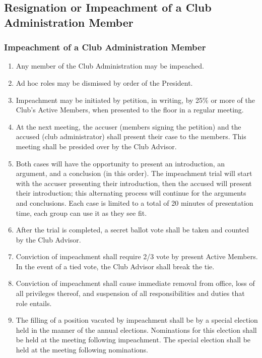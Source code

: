 \documentclass[english,11pt]{article}
\begin{document}
\subsection{Resignation or Impeachment of a Club Administration Member} \label{sect:cadmin:removal}

\subsubsection{Impeachment of a Club Administration Member} \label{subsect:cadmin:removal:impeachment}

\begin{enumerate}[label=\alph*.]
    \item Any member of the Club Administration may be impeached.
    \item Ad hoc roles may be dismissed by order of the President.
    \item Impeachment may be initiated by petition, in writing, by 25\% or more of the Club's Active Members, when presented to the floor in a regular meeting.
    \item At the next meeting, the accuser (members signing the petition) and the accused (club administrator) shall present their case to the members.
        This meeting shall be presided over by the Club Advisor.
    \item Both cases will have the opportunity to present an introduction, an argument, and a conclusion (in this order).
        The impeachment trial will start with the accuser presenting their introduction, then the accused will present their introduction; this alternating process will continue for the arguments and conclusions.
        Each case is limited to a total of 20 minutes of presentation time, each group can use it as they see fit.
    \item After the trial is completed, a secret ballot vote shall be taken and counted by the Club Advisor.
    \item Conviction of impeachment shall require 2/3 vote by present Active Members.
        In the event of a tied vote, the Club Advisor shall break the tie.
    \item Conviction of impeachment shall cause immediate removal from office, loss of all privileges thereof, and suspension of all responsibilities and duties that role entails.
    \item The filling of a position vacated by impeachment shall be by a special election held in the manner of the annual elections.
        Nominations for this election shall be held at the meeting following impeachment.
        The special election shall be held at the meeting following nominations.
\end{enumerate}
\end{document}
